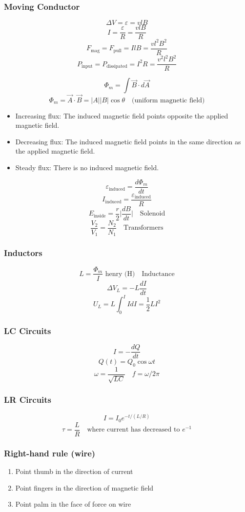 \documentclass[twocolumn]{article}
\begin{document}
\subsubsection*{Moving Conductor}
\[\Delta V = \varepsilon = vlB\]
\[I = \frac{\varepsilon}{R} = \frac{vlB}{R}\]
\[F_\text{mag}=F_\text{pull}=IlB=\frac{vl^2 B^2}{R}\]
\[P_\text{input}=P_\text{dissipated}=I^2 R=\frac{v^2 l^2 B^2}{R}\]

\[\Phi_m=\int\vec{B}\cdot d\vec{A}\]
\[\Phi_m = \vec{A}\cdot\vec{B}=|A||B|\cos\theta\quad\text{(uniform magnetic field)}\]

\begin{itemize}
    \item Increasing flux: The induced magnetic field points opposite the applied magnetic
    field.
    \item Decreasing flux: The induced magnetic field points in the same direction as the
    applied magnetic field.
    \item Steady flux: There is no induced magnetic field.
\end{itemize}

\[\varepsilon_\text{induced} = \frac{d\Phi_m}{dt}\]
\[I_\text{induced}=\frac{\varepsilon_\text{induced}}{R}\]
\[E_\text{inside}=\frac{r}{2}\Big|\frac{dB}{dt}\Big|\quad\text{Solenoid}\]
\[\frac{V_2}{V_1} = \frac{N_2}{N_1}\quad\text{Transformers}\]
\subsubsection*{Inductors}
\[L=\frac{\Phi_m}{I}\text{ henry (H)}\quad\text{Inductance}\]
\[\Delta V_L = -L\frac{dI}{dt}\]
\[U_L = L\int_{0}^{I}IdI = \frac{1}{2}LI^2\]

\subsubsection*{LC Circuits}
\[I=-\frac{dQ}{dt}\]
\[Q(t)=Q_0\cos\omega t\]
\[\omega = \frac{1}{\sqrt{LC}}\quad f =\omega / 2\pi \]

\subsubsection*{LR Circuits}
\[I=I_0 e^{-t/(L / R)}\]
\[\tau = \frac{L}{R}\quad\text{where current has decreased to }e^{-1}\]
\subsubsection*{Right-hand rule (wire)}
\begin{enumerate}
    \item Point thumb in the direction of current
    \item Point fingers in the direction of magnetic field
    \item Point palm in the face of force on wire
\end{enumerate}
\end{document}
